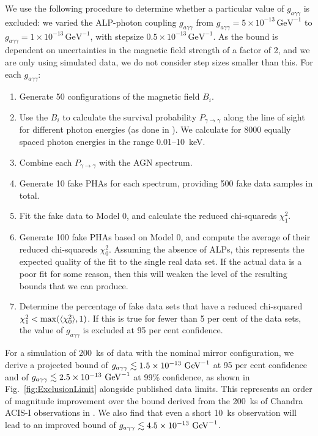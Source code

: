 \documentclass[fleqn,usenatbib,useAMS]{mnras}
\begin{document}
We use the following procedure to determine whether a particular value of $g_{a \gamma \gamma}$ is excluded: we varied the ALP-photon coupling $g_{a \gamma \gamma}$ from $g_{a \gamma \gamma} = 5 \times 10^{-13} \, \text{GeV}^{-1}$ to $g_{a \gamma \gamma} = 1\times 10^{-13} \, \text{GeV}^{-1}$, with stepsize $0.5 \times 10^{-13} \, \text{GeV}^{-1}$. As the bound is dependent on uncertainties in the magnetic field strength of a factor of 2, and we are only using simulated data, we do not consider step sizes smaller than this. For each $g_{a \gamma \gamma}$:
\begin{enumerate}
\item Generate 50 configurations of the magnetic field $B_i$.
\item Use the $B_i$ to calculate the survival probability $P_{\gamma \rightarrow \gamma}$ along the line of sight for different photon energies (as done in \cite{1312.3947}). We calculate for 8000 equally spaced photon energies in the range 0.01--10~keV.
\item Combine each $P_{\gamma \rightarrow \gamma}$ with the AGN spectrum.
\item Generate 10 fake PHAs for each spectrum, providing 500 fake data samples in total.
\item Fit the fake data to Model 0, and calculate the reduced chi-squareds $\chi_1^2$.
\item Generate 100 fake PHAs based on Model 0, and compute the average of their reduced chi-squareds $\chi_0^2$.
Assuming the absence of ALPs, this represents the expected quality of the fit to the single real data set. If the actual data is a poor fit
for some reason, then this will weaken the level of the resulting bounds that we can produce.
\item Determine the percentage of fake data sets that have a reduced chi-squared $\chi_1^2 < \rm{max}(\langle \chi_0^2 \rangle,1)$. If this is true for fewer than 5 per cent of the data sets, the value of $g_{a \gamma \gamma}$ is excluded at 95 per cent confidence.
\end{enumerate}

For a simulation of 200~ks of data with the nominal mirror configuration, we derive a projected
bound of ${g_{a\gamma\gamma} \lesssim 1.5 \times 10^{-13}~ \rm{GeV}^{-1}}$ at 95 per cent confidence and of ${g_{a\gamma\gamma} \lesssim 2.5 \times 10^{-13}~ \rm{GeV}^{-1}}$ at 99\% confidence, as shown in Fig.~\ref{fig:ExclusionLimit} alongside published data limits. This represents an order of magnitude improvement over the bound derived from the 200~ks of Chandra ACIS-I observations in \cite{Berg:2016ese}. We also find that even
a short 10~ks observation will lead to an improved bound of ${g_{a\gamma\gamma} \lesssim 4.5 \times 10^{-13}~ \rm{GeV}^{-1}}$.
\end{document}
